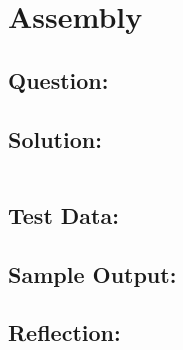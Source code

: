 \documentclass[Lab-B.tex]{subfiles}
\begin{document}
    \section{Assembly}
        \subsection*{Question:}
            
        \subsection*{Solution:}
            \inputminted{cpp}{}%

        \subsection*{Test Data:}
        
        \subsection*{Sample Output:}

        \subsection*{Reflection:}
\end{document}
